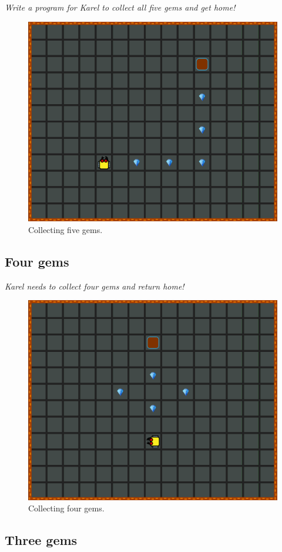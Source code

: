 {{{\em Write a program for Karel to collect all five gems and get home!}
\begin{figure}[!ht]
\begin{center}
\includegraphics[height=0.4\textwidth]{img/a18.png}
\end{center}
\vspace{-4mm}
\caption{Collecting five gems.}
\label{fig:a18}
\vspace{-4mm}
\end{figure}



\subsection{Four gems}
{\em Karel needs to collect four gems and return home!}

\begin{figure}[!ht]
\begin{center}
\includegraphics[height=0.4\textwidth]{img/a19.png}
\end{center}
\vspace{-4mm}
\caption{Collecting four gems.}
\label{fig:b06}
\vspace{-10mm}
\end{figure}



\subsection{Three gems}

}}
